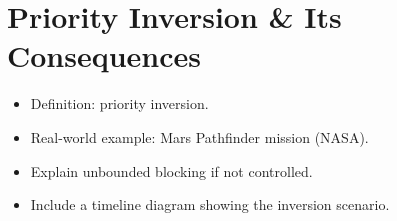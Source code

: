 \documentclass{article}
\begin{document}
 
\section{Priority Inversion & Its Consequences}
\begin{itemize}
    
\item Definition: priority inversion.
\item Real-world example: Mars Pathfinder mission (NASA).
\item Explain unbounded blocking if not controlled.
\item Include a timeline diagram showing the inversion scenario.
\end{itemize}
\end{document}
